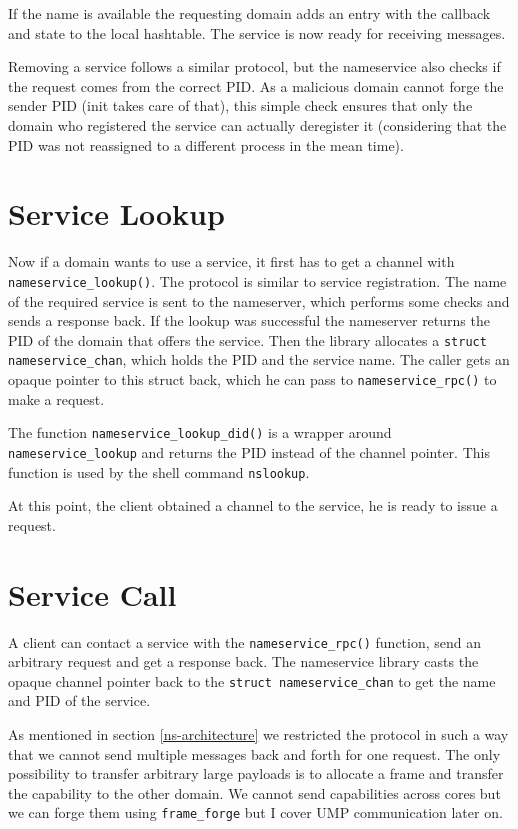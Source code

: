 If the name is available the requesting domain adds an entry with the callback and state to the local hashtable. The service is now
ready for receiving messages.

Removing a service follows a similar protocol, but the nameservice also checks if the request comes from the correct PID. As a malicious
domain cannot forge the sender PID (init takes care of that), this simple check ensures that only the domain who registered the service
can actually deregister it (considering that the PID was not reassigned to a different process in the mean time).

\section{Service Lookup}

Now if a domain wants to use a service, it first has to get a channel with \verb|nameservice_lookup()|. The protocol is similar to
service registration. The name of the required service is sent to the nameserver, which performs some checks and sends a response back.
If the lookup was successful the nameserver returns the PID of the domain that offers the service. Then the library allocates a 
\verb|struct nameservice_chan|, which holds the PID and the service name. The caller gets an opaque pointer to this struct back, which
he can pass to \verb|nameservice_rpc()| to make a request.

The function \verb|nameservice_lookup_did()| is a wrapper around \verb|nameservice_lookup| and returns the PID instead of the channel pointer.
This function is used by the shell command \verb|nslookup|.

At this point, the client obtained a channel to the service, he is ready to issue a request.

\section{Service Call}
\label{ns-service-call}

A client can contact a service with the \verb|nameservice_rpc()| function, send an arbitrary request and get a response back. The nameservice
library casts the opaque channel pointer back to the \verb|struct nameservice_chan| to get the name and PID of the service. 

As mentioned in section \ref{ns-architecture} we restricted the protocol in such a way that we cannot send multiple messages back and forth 
for one request. The only possibility to transfer arbitrary large payloads is to allocate a frame and transfer the capability to the other 
domain. We cannot send capabilities across cores but we can forge them using \verb|frame_forge| but I cover UMP communication later on.

